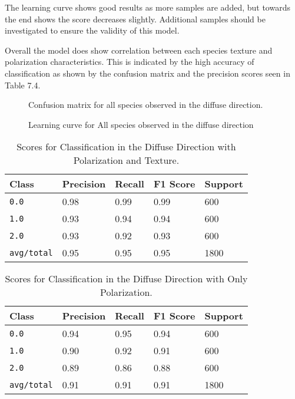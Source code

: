 The learning curve shows good results as more samples are added, but towards the end shows the score decreases slightly.  Additional samples should be investigated to ensure the validity of this model.

Overall the model does show correlation between each species texture and polarization characteristics.  This is indicated by the high accuracy of classification as shown by the confusion matrix and the precision scores seen in Table 7.4.
%
\begin{figure}
    \begin{center}
    \end{center}
    \caption{Confusion matrix for all species observed in the diffuse direction.}
    \label{fig:polarization}
\end{figure}
%
%
\begin{figure}
    \begin{center}
    \end{center}
    \caption{Learning curve for All species observed in the diffuse direction}
    \label{fig:polarization}
\end{figure}
%
%
\begin{table}
  \centering
  \begin{tabular}{lllll}
    \toprule
    \textbf{Class} & \textbf{Precision} & \textbf{Recall} & \textbf{F1 Score} & \textbf{Support} \\
    \midrule
      \texttt{0.0} & 0.98 & 0.99 & 0.99 & 600 \\
      \texttt{1.0} & 0.93 & 0.94 & 0.94 & 600 \\
      \texttt{2.0} & 0.93 & 0.92 & 0.93 & 600 \\
      \texttt{avg/total} & 0.95 & 0.95 & 0.95 & 1800 \\
    \bottomrule
  \end{tabular}
  \caption{%
    Scores for Classification in the Diffuse Direction with Polarization and Texture.
  }
  \label{tab:Packages}
\end{table}
\begin{table}
  \centering
  \begin{tabular}{lllll}
    \toprule
    \textbf{Class} & \textbf{Precision} & \textbf{Recall} & \textbf{F1 Score} & Support\\
    \midrule
      \texttt{0.0} & 0.94 & 0.95 & 0.94 & 600 \\
      \texttt{1.0} & 0.90 & 0.92 & 0.91 & 600 \\
      \texttt{2.0} & 0.89 & 0.86 & 0.88 & 600 \\
      \texttt{avg/total} & 0.91 & 0.91 & 0.91 & 1800 \\
    \bottomrule
  \end{tabular}
  \caption{%
    Scores for Classification in the Diffuse Direction with Only Polarization.
  }
  \label{tab:Packages}
\end{table}
